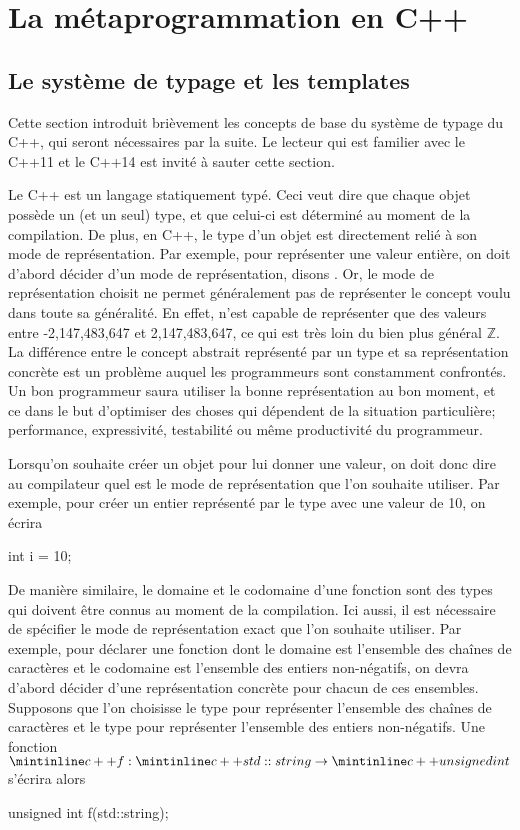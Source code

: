 \newcommand{\MPL}{http://www.boost.org/doc/libs/release/libs/mpl/doc/index.html}
\newcommand{\Hana}{http://ldionne.github.io/hana}

\section{La métaprogrammation en C++}


\subsection{Le système de typage et les templates}
Cette section introduit brièvement les concepts de base du système de typage
du C++, qui seront nécessaires par la suite. Le lecteur qui est familier avec
le C++11 et le C++14 est invité à sauter cette section.

Le C++ est un langage statiquement typé. Ceci veut dire que chaque objet
possède un (et un seul) type, et que celui-ci est déterminé au moment de la
compilation. De plus, en C++, le type d'un objet est directement relié à son
mode de représentation. Par exemple, pour représenter une valeur entière, on
doit d'abord décider d'un mode de représentation, disons . Or, le mode
de représentation choisit ne permet généralement pas de représenter le concept
voulu dans toute sa généralité. En effet,  n'est capable de représenter
que des valeurs entre -2,147,483,647 et 2,147,483,647, ce qui est très loin
du bien plus général $\mathbb{Z}$. La différence entre le concept abstrait
représenté par un type et sa représentation concrète est un problème auquel
les programmeurs sont constamment confrontés. Un bon programmeur saura
utiliser la bonne représentation au bon moment, et ce dans le but d'optimiser
des choses qui dépendent de la situation particulière; performance,
expressivité, testabilité ou même productivité du programmeur.

Lorsqu'on souhaite créer un objet pour lui donner une valeur, on doit donc
dire au compilateur quel est le mode de représentation que l'on souhaite
utiliser. Par exemple, pour créer un entier représenté par le type 
avec une valeur de 10, on écrira
\begin{cpp}
    int i = 10;
\end{cpp}

De manière similaire, le domaine et le codomaine d'une fonction sont des
types qui doivent être connus au moment de la compilation. Ici aussi, il
est nécessaire de spécifier le mode de représentation exact que l'on souhaite
utiliser. Par exemple, pour déclarer une fonction dont le domaine est
l'ensemble des chaînes de caractères et le codomaine est l'ensemble des
entiers non-négatifs, on devra d'abord décider d'une représentation concrète
pour chacun de ces ensembles. Supposons que l'on choisisse le type
 pour représenter l'ensemble des chaînes de caractères et le
type  pour représenter l'ensemble des entiers non-négatifs.
Une fonction $\cc{f} : \cc{std::string} \to \cc{unsigned int}$ s'écrira
alors
\begin{cpp}
    unsigned int f(std::string);
\end{cpp}

